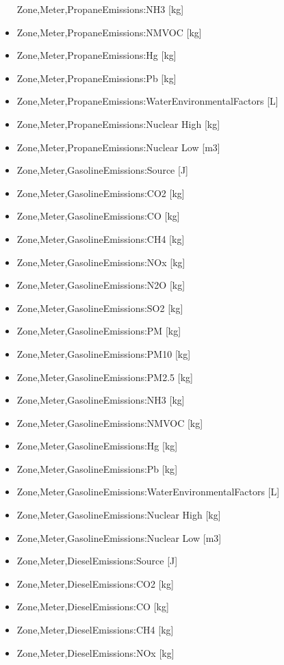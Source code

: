 \begin{itemize}
  Zone,Meter,PropaneEmissions:NH3 {[}kg{]}
\item
  Zone,Meter,PropaneEmissions:NMVOC {[}kg{]}
\item
  Zone,Meter,PropaneEmissions:Hg {[}kg{]}
\item
  Zone,Meter,PropaneEmissions:Pb {[}kg{]}
\item
  Zone,Meter,PropaneEmissions:WaterEnvironmentalFactors {[}L{]}
\item
  Zone,Meter,PropaneEmissions:Nuclear High {[}kg{]}
\item
  Zone,Meter,PropaneEmissions:Nuclear Low {[}m3{]}
\item
  Zone,Meter,GasolineEmissions:Source {[}J{]}
\item
  Zone,Meter,GasolineEmissions:CO2 {[}kg{]}
\item
  Zone,Meter,GasolineEmissions:CO {[}kg{]}
\item
  Zone,Meter,GasolineEmissions:CH4 {[}kg{]}
\item
  Zone,Meter,GasolineEmissions:NOx {[}kg{]}
\item
  Zone,Meter,GasolineEmissions:N2O {[}kg{]}
\item
  Zone,Meter,GasolineEmissions:SO2 {[}kg{]}
\item
  Zone,Meter,GasolineEmissions:PM {[}kg{]}
\item
  Zone,Meter,GasolineEmissions:PM10 {[}kg{]}
\item
  Zone,Meter,GasolineEmissions:PM2.5 {[}kg{]}
\item
  Zone,Meter,GasolineEmissions:NH3 {[}kg{]}
\item
  Zone,Meter,GasolineEmissions:NMVOC {[}kg{]}
\item
  Zone,Meter,GasolineEmissions:Hg {[}kg{]}
\item
  Zone,Meter,GasolineEmissions:Pb {[}kg{]}
\item
  Zone,Meter,GasolineEmissions:WaterEnvironmentalFactors {[}L{]}
\item
  Zone,Meter,GasolineEmissions:Nuclear High {[}kg{]}
\item
  Zone,Meter,GasolineEmissions:Nuclear Low {[}m3{]}
\item
  Zone,Meter,DieselEmissions:Source {[}J{]}
\item
  Zone,Meter,DieselEmissions:CO2 {[}kg{]}
\item
  Zone,Meter,DieselEmissions:CO {[}kg{]}
\item
  Zone,Meter,DieselEmissions:CH4 {[}kg{]}
\item
  Zone,Meter,DieselEmissions:NOx {[}kg{]}

\end{itemize}

